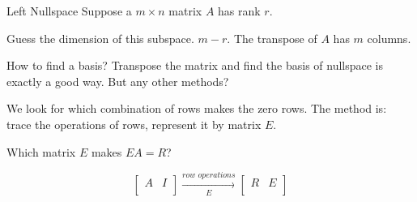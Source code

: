 \documentclass{beamer}
\begin{document}
\begin{frame}{Left Nullspace}
Suppose a $m \times n$ matrix $A$ has rank $r$.

\vspace{3pt}
Guess the dimension of this subspace. $m-r$. The transpose of $A$ has $m$ columns.

\vspace{3pt}
How to find a basis? Transpose the matrix and find the basis of nullspace is exactly a good way. But any other methods?

\vspace{3pt}
We look for which combination of rows makes the zero rows. The method is: trace the operations of rows, represent it by matrix $E$.

\vspace{3pt}
Which matrix $E$ makes $EA=R$?

\begin{equation*}
    \left[ \begin{matrix}
        A&		I\\
    \end{matrix} \right] \xrightarrow[E]{row\,\,operations}\left[ \begin{matrix}
        R&		E\\
    \end{matrix} \right]
\end{equation*}
\end{frame}
\end{document}
